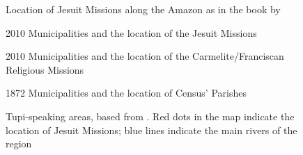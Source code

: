 \begin{figure}[H]
	\begin{center}
	\end{center}
	\caption{Location of Jesuit Missions along the Amazon as in the book by {\protect\textcite{Leite1943-dy}}}
	\label{fig:SerafimLeite}
\end{figure}

\begin{landscape}
\begin{figure}[t]
	\begin{center}
	\end{center}
	\caption{2010 Municipalities and the location of the Jesuit Missions}
	\label{fig:JesuitMissions2010Map}
\end{figure}
\end{landscape}

\begin{landscape}
\begin{figure}[t]
	\begin{center}
	\end{center}
	\caption{2010 Municipalities and the location of the Carmelite/Franciscan Religious Missions}
	\label{fig:NonJesuitMissions2010Map}
\end{figure}
\end{landscape}


\begin{landscape}
  \begin{figure}[t]
    \begin{center}
    \end{center}
    \caption{1872 Municipalities and the location of Census' Parishes}
    \label{fig:Parishes1872}
  \end{figure}
\end{landscape}

\begin{landscape}
  \begin{figure}[t]
    \begin{center}
    \end{center}
    \caption{Tupi-speaking areas, based from {\protect\textcite{Clement2015-rf}}. Red dots in the map indicate the location of Jesuit Missions; blue lines indicate the main rivers of the region}
    \label{fig:TupiSpeaking}
  \end{figure}
\end{landscape}

